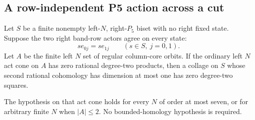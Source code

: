 \subsection{A row-independent P5 action across a cut}

\begin{proposition}
\label{CP2:A-P5-row-independent}
Let $S$ be a finite nonempty left-$N$, right-$P_5$ biset
with no right fixed state. Suppose the two right band-row
actors agree on every state:
\[
 se_{0j}=se_{1j}\qquad(s\in S,\ j=0,1).
\]
Let $A$ be the finite left $N$ set of regular column-core
orbits. If the ordinary left $N$ act cone on $A$ has zero
rational degree-two products, then a collage on $S$ whose
second rational cohomology has dimension at most one has
zero degree-two squares.

The hypothesis on that act cone holds for every $N$ of
order at most seven, or for arbitrary finite $N$ when
$|A|\le2$. No bounded-homology hypothesis is required.
\end{proposition}
